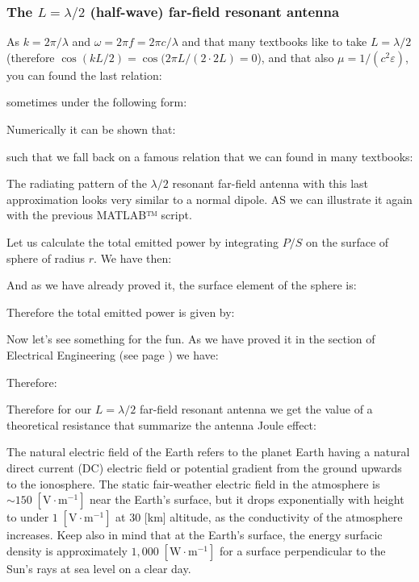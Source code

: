 	\subsubsection{The $L=\lambda/2$ (half-wave) far-field resonant antenna}
	As $k=2\pi/\lambda$ and $\omega=2\pi f=2\pi c/\lambda$ and that many textbooks like to take $L=\lambda/2$ (therefore $\cos(kL/2)=\cos(2\pi L/(2\cdot 2L)=0$), and that also $\mu=1/(c^2\varepsilon)$, you can found the last relation:
	
	sometimes under the following form:
	
	
	Numerically it can be shown that:
	
	such that we fall back on a famous relation that we can found in many textbooks:
	
	The radiating pattern of the $\lambda/2$ resonant far-field antenna with this last approximation looks very similar to a normal dipole. AS we can illustrate it again with the previous MATLAB™ script.
	
	Let us calculate the total emitted power by integrating $P/S$ on the surface of sphere of radius $r$. We have then:
	
	And as we have already proved it, the surface element of the sphere is:
	
	Therefore the total emitted power is given by:
	
	Now let's see something for the fun. As we have proved it in the section of Electrical Engineering (see page \pageref{average power}) we have:
	
	Therefore:
	
	Therefore for our $L=\lambda/2$ far-field resonant antenna we get the value of a theoretical resistance that summarize the antenna Joule effect:
	
	
	
	\begin{tcolorbox}[title=Remark,colframe=black,arc=10pt]
	The natural electric field of the Earth refers to the planet Earth having a natural direct current (DC) electric field or potential gradient from the ground upwards to the ionosphere. The static fair-weather electric field in the atmosphere is $\sim 150\;[\text{V}\cdot\text{m}^{-1}]$  near the Earth's surface, but it drops exponentially with height to under $1 \;[\text{V}\cdot\text{m}^{-1}]$ at $30$ [km] altitude, as the conductivity of the atmosphere increases. Keep also in mind that at the Earth's surface, the energy surfacic density is approximately $1,000\;[\text{W}\cdot\text{m}^{-1}]$ for a surface perpendicular to the Sun's rays at sea level on a clear day.
	\end{tcolorbox}
	
